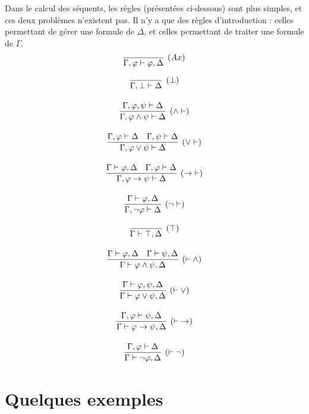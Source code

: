 \documentclass[a4paper,french,bookmarks]{article}
\begin{document}
    Dans le calcul des séquents, les règles (présentées ci-dessous) sont plus simples, et ces deux problèmes n'existent pas. Il n'y a que des règles d'introduction : celles permettant de gérer une formule de $\Delta$, et celles permettant de traiter une formule de $\Gamma$.\bigskip
    \[ \infer[(Ax)]{\Gamma, \varphi \vdash \varphi, \Delta}{} \]
    \begin{minipage}{0.5\linewidth}
        \begin{gather*}
            \infer[(\bot)]{\Gamma, \bot \vdash \Delta}{}\\[9pt]
            \infer[(\land \vdash)]{\Gamma, \varphi \land \psi \vdash \Delta}{\Gamma, \varphi, \psi \vdash \Delta}\\[9pt]
            \infer[(\lor \vdash)]{\Gamma, \varphi \lor \psi \vdash \Delta}{\Gamma, \varphi \vdash \Delta & \Gamma, \psi \vdash \Delta}\\[9pt]
            \infer[(\rightarrow\;\vdash)]{\Gamma, \varphi \rightarrow \psi \vdash \Delta}{\Gamma \vdash \varphi, \Delta & \Gamma, \varphi \vdash \Delta}\\[9pt]
            \infer[(\neg \vdash)]{\Gamma, \neg \varphi \vdash \Delta}{\Gamma \vdash \varphi, \Delta}
        \end{gather*}
    \end{minipage}
    \begin{minipage}{0.5\linewidth}
        \begin{gather*}
            \infer[(\top)]{\Gamma \vdash \top, \Delta}{}\\[9pt]
            \infer[(\vdash \land)]{\Gamma \vdash \varphi \land \psi, \Delta}{\Gamma \vdash \varphi, \Delta & \Gamma \vdash \psi, \Delta}\\[9pt]
            \infer[(\vdash \lor)]{\Gamma \vdash \varphi \lor \psi, \Delta}{\Gamma \vdash \varphi, \psi, \Delta}\\[9pt]
            \infer[(\vdash\; \rightarrow)]{\Gamma \vdash \varphi \rightarrow \psi, \Delta}{\Gamma, \varphi \vdash \psi, \Delta}\\[9pt]
            \infer[(\vdash \neg)]{\Gamma \vdash \neg \varphi, \Delta}{\Gamma, \varphi \vdash \Delta}
        \end{gather*}
    \end{minipage}
    
    \section{Quelques exemples}
    
\end{document}
